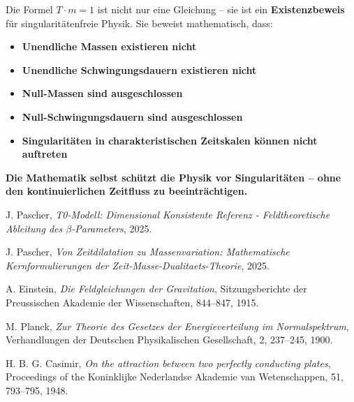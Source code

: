 \documentclass[12pt,a4paper]{article}
\theoremstyle{definition}
\theoremstyle{remark}
\begin{document}
Die Formel $T \cdot m = 1$ ist nicht nur eine Gleichung -- sie ist ein \textbf{Existenzbeweis} für singularitätenfreie Physik. Sie beweist mathematisch, dass:

\begin{itemize}
	\item \textbf{Unendliche Massen existieren nicht}
	\item \textbf{Unendliche Schwingungsdauern existieren nicht}
	\item \textbf{Null-Massen sind ausgeschlossen}
	\item \textbf{Null-Schwingungsdauern sind ausgeschlossen}
	\item \textbf{Singularitäten in charakteristischen Zeitskalen können nicht auftreten}
\end{itemize}

\textbf{Die Mathematik selbst schützt die Physik vor Singularitäten -- ohne den kontinuierlichen Zeitfluss zu beeinträchtigen.}	
	\begin{thebibliography}{99}


		
		J. Pascher, \textit{T0-Modell: Dimensional Konsistente Referenz - Feldtheoretische Ableitung des $\beta$-Parameters}, 2025.
		
		J. Pascher, \textit{Von Zeitdilatation zu Massenvariation: Mathematische Kernformulierungen der Zeit-Masse-Dualitaets-Theorie}, 2025.
		
		A. Einstein, \textit{Die Feldgleichungen der Gravitation}, Sitzungsberichte der Preussischen Akademie der Wissenschaften, 844--847, 1915.
		
		M. Planck, \textit{Zur Theorie des Gesetzes der Energieverteilung im Normalspektrum}, Verhandlungen der Deutschen Physikalischen Gesellschaft, 2, 237--245, 1900.
		
		H. B. G. Casimir, \textit{On the attraction between two perfectly conducting plates}, Proceedings of the Koninklijke Nederlandse Akademie van Wetenschappen, 51, 793--795, 1948.
	\end{thebibliography}
	
\end{document}
